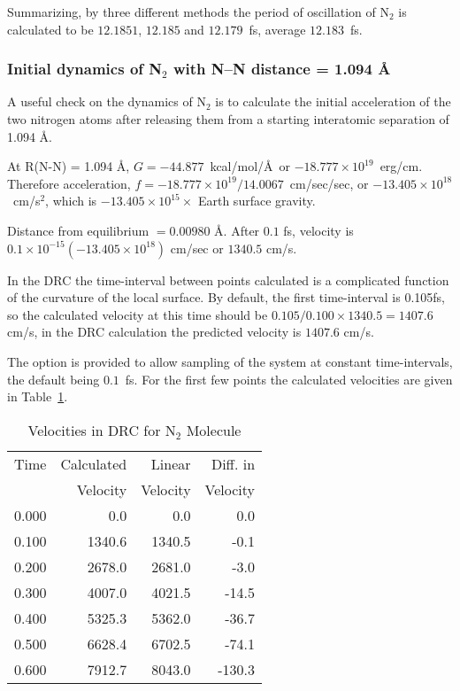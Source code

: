 Summarizing, by three different methods the period  of  oscillation of N$_2$
is calculated to be $12.1851$, $12.185$ and $12.179$~fs, average $12.183$~fs.

\subsubsection{Initial dynamics of \mbox{N$_{2}$} with N--N distance = 1.094 \AA}
A useful check on the dynamics of N$_2$ is to  calculate  the  initial
acceleration  of  the  two  nitrogen  atoms  after releasing them from a
starting interatomic separation of 1.094 \AA.

At R(N-N) = 1.094 \AA, $G = -44.877$~kcal/mol/\AA\ or $-18.777 \times
10^{19}$~erg/cm. Therefore acceleration, $f = -18.777 \times 10^{19}
/14.0067$~cm/sec/sec, or $-13.405 \times 10^{18}$~cm/s$^2$, which is $ -13.405
\times 10^{15} \times$ Earth surface gravity.

Distance from equilibrium  $= 0.00980$ \AA. After $0.1$ fs, velocity is
$0.1\times  10^{-15} (-13.405 \times  10^{18})$ cm/sec or $1340.5$ cm/s.

In the  DRC  the  time-interval  between  points  calculated  is  a complicated
function of the curvature of the local surface.  By default, the first
time-interval is 0.105fs, so the calculated velocity  at  this time should be
$0.105/0.100 \times 1340.5 = 1407.6$ cm/s, in the DRC calculation the predicted
velocity is $1407.6$ cm/s.

The option is provided to allow sampling of the system at  constant
time-intervals,  the  default being $0.1$~fs.  For the first few points the
calculated velocities are given in Table~\ref{tdrc}.

\begin{table}
\caption{\label{tdrc} Velocities in DRC for N$_2$ Molecule}
\begin{center}
\begin{tabular}{rrrr}\\ \hline
      Time  & Calculated &  Linear &    Diff. in \\
            & Velocity  & Velocity &  Velocity \\ \hline
      0.000 &      0.0  &    0.0   &    0.0  \\
      0.100 &   1340.6  & 1340.5   &   -0.1  \\
      0.200 &   2678.0  & 2681.0   &   -3.0  \\
      0.300 &   4007.0  & 4021.5   &  -14.5  \\
      0.400 &   5325.3  & 5362.0   &  -36.7  \\
      0.500 &   6628.4  & 6702.5   &  -74.1  \\
      0.600 &   7912.7  & 8043.0   & -130.3  \\ \hline
\end{tabular}
\end{center}
\end{table}

